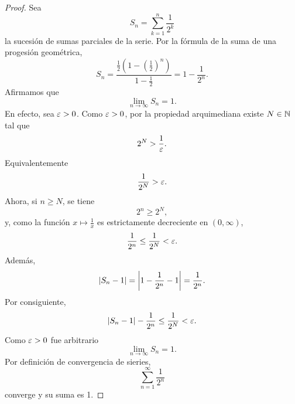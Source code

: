 \documentclass[12pt,a4paper]{article}
\newcommand{\paren}[1]{\left( #1 \right)}
\begin{document}
    \begin{proof}
        Sea
        \begin{equation*}
            S_{n}=\sum_{k=1}^{n}\frac{1}{2^{k}}
        \end{equation*}
        la sucesión de sumas parciales de la serie. Por la fórmula
        de la suma de una progesión geométrica,
        \begin{equation*}
            S_{n}=\frac{\frac12\paren{1-\paren{\frac12}^{n}}}{1-\frac{1}{2}}=1-\frac{1}{2^{n}}.
        \end{equation*}
        Afirmamos que
        \begin{equation*}
            \lim_{n\to\infty}S_{n}=1.
        \end{equation*}
        En efecto, sea $\varepsilon>0$. Como $\varepsilon>0$, por la propiedad arquimediana
        existe $N\in\mathbb{N}$ tal que
        \begin{equation*}
            2^{N}>\frac{1}{\varepsilon}.
        \end{equation*}
        Equivalentemente
        \begin{equation*}
            \frac{1}{2^{N}}>\varepsilon.
        \end{equation*}
        Ahora, si $n\geq N$, se tiene
        \begin{equation*}
            2^{n}\geq 2^{N},
        \end{equation*}
        y, como la función $x\mapsto\frac{1}{x}$ es estrictamente decreciente en
        $(0,\infty)$,
        \begin{equation*}
            \frac{1}{2^{n}}\leq\frac{1}{2^{N}}<\varepsilon.
        \end{equation*}
        Además,
        \begin{equation*}
            \abs{S_{n}-1}=\abs{1-\frac{1}{2^{n}}-1}=\frac{1}{2^{n}}.
        \end{equation*}
        Por consiguiente,
        \begin{equation*}
            \abs{S_{n}-1}-\frac{1}{2^{n}}\leq\frac{1}{2^{N}}<\varepsilon.
        \end{equation*}
        Como $\varepsilon>0$ fue arbitrario
        \begin{equation*}
            \lim_{n\to\infty}S_{n}=1.
        \end{equation*}
        Por definición de convergencia de sieries,
        \begin{equation*}
            \sum_{n=1}^{\infty}\frac{1}{2^{n}}
        \end{equation*}
        converge y su suma es 1.
    \end{proof}
\end{document}
